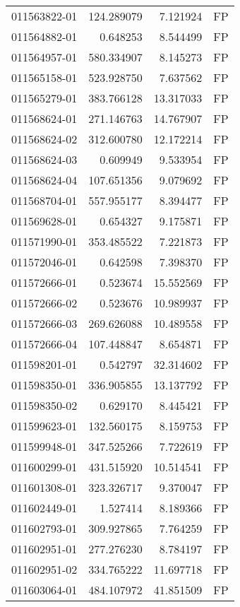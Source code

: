 \begin{tabular}{lrrl}
011563822-01 &  124.289079 &     7.121924 &   FP \\
011564882-01 &    0.648253 &     8.544499 &   FP \\
011564957-01 &  580.334907 &     8.145273 &   FP \\
011565158-01 &  523.928750 &     7.637562 &   FP \\
011565279-01 &  383.766128 &    13.317033 &   FP \\
011568624-01 &  271.146763 &    14.767907 &   FP \\
011568624-02 &  312.600780 &    12.172214 &   FP \\
011568624-03 &    0.609949 &     9.533954 &   FP \\
011568624-04 &  107.651356 &     9.079692 &   FP \\
011568704-01 &  557.955177 &     8.394477 &   FP \\
011569628-01 &    0.654327 &     9.175871 &   FP \\
011571990-01 &  353.485522 &     7.221873 &   FP \\
011572046-01 &    0.642598 &     7.398370 &   FP \\
011572666-01 &    0.523674 &    15.552569 &   FP \\
011572666-02 &    0.523676 &    10.989937 &   FP \\
011572666-03 &  269.626088 &    10.489558 &   FP \\
011572666-04 &  107.448847 &     8.654871 &   FP \\
011598201-01 &    0.542797 &    32.314602 &   FP \\
011598350-01 &  336.905855 &    13.137792 &   FP \\
011598350-02 &    0.629170 &     8.445421 &   FP \\
011599623-01 &  132.560175 &     8.159753 &   FP \\
011599948-01 &  347.525266 &     7.722619 &   FP \\
011600299-01 &  431.515920 &    10.514541 &   FP \\
011601308-01 &  323.326717 &     9.370047 &   FP \\
011602449-01 &    1.527414 &     8.189366 &   FP \\
011602793-01 &  309.927865 &     7.764259 &   FP \\
011602951-01 &  277.276230 &     8.784197 &   FP \\
011602951-02 &  334.765222 &    11.697718 &   FP \\
011603064-01 &  484.107972 &    41.851509 &   FP \\

\end{tabular}
